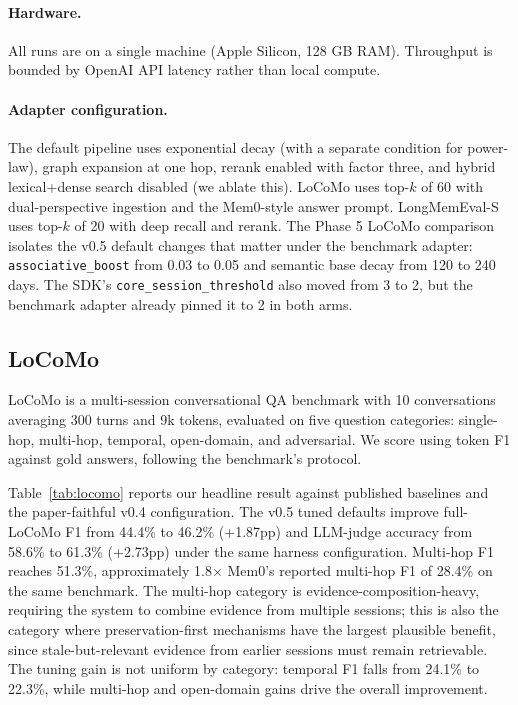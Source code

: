 \documentclass[11pt,a4paper]{article}
\begin{document}
\paragraph{Hardware.} All runs are on a single machine (Apple Silicon, 128 GB RAM). Throughput is bounded by OpenAI API latency rather than local compute.

\paragraph{Adapter configuration.} The default pipeline uses exponential decay (with a separate condition for power-law), graph expansion at one hop, rerank enabled with factor three, and hybrid lexical+dense search disabled (we ablate this). LoCoMo uses top-$k$ of 60 with dual-perspective ingestion and the Mem0-style answer prompt. LongMemEval-S uses top-$k$ of 20 with deep recall and rerank. The Phase 5 LoCoMo comparison isolates the v0.5 default changes that matter under the benchmark adapter: \texttt{associative\_boost} from 0.03 to 0.05 and semantic base decay from 120 to 240 days. The SDK's \texttt{core\_session\_threshold} also moved from 3 to 2, but the benchmark adapter already pinned it to 2 in both arms.

\subsection{LoCoMo}
\label{sec:eval-locomo}

LoCoMo is a multi-session conversational QA benchmark with 10 conversations averaging 300 turns and 9k tokens, evaluated on five question categories: single-hop, multi-hop, temporal, open-domain, and adversarial. We score using token F1 against gold answers, following the benchmark's protocol.

Table~\ref{tab:locomo} reports our headline result against published baselines and the paper-faithful v0.4 configuration. The v0.5 tuned defaults improve full-LoCoMo F1 from 44.4\% to 46.2\% (+1.87pp) and LLM-judge accuracy from 58.6\% to 61.3\% (+2.73pp) under the same harness configuration. Multi-hop F1 reaches 51.3\%, approximately 1.8$\times$ Mem0's reported multi-hop F1 of 28.4\% on the same benchmark. The multi-hop category is evidence-composition-heavy, requiring the system to combine evidence from multiple sessions; this is also the category where preservation-first mechanisms have the largest plausible benefit, since stale-but-relevant evidence from earlier sessions must remain retrievable. The tuning gain is not uniform by category: temporal F1 falls from 24.1\% to 22.3\%, while multi-hop and open-domain gains drive the overall improvement.
\end{document}
